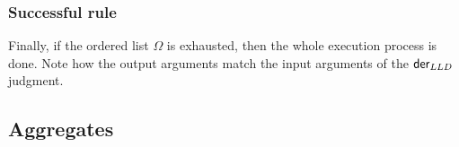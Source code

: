 

\subsubsection{Successful rule}

Finally, if the ordered list $\Omega$ is exhausted, then the whole execution
process is done.  Note how the output arguments match the input arguments of the
$\mathsf{der}_{LLD} \;$judgment.



\subsection{Aggregates}



